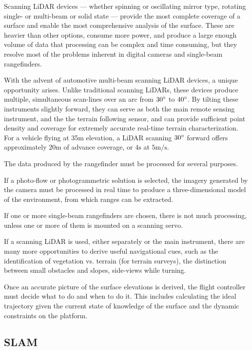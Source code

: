 \documentclass[10pt,a4paper]{report}
\begin{document}
Scanning LiDAR devices --- whether spinning or oscillating mirror type, rotating single- or multi-beam or solid state --- provide the most complete coverage of a surface and enable the most comprehensive analysis of the surface. These are heavier than other options, consume more power, and produce a large enough volume of data that processing can be complex and time consuming, but they resolve most of the problems inherent in digital cameras and single-beam rangefinders.

With the advent of automotive multi-beam scanning LiDAR devices, a unique opportunity arises. Unlike traditional scanning LiDARs, these devices produce multiple, simultaneous scan-lines over an arc from $30\degree$ to $40\degree$. By tilting these instruments slightly forward, they can serve as both the main remote sensing instrument, and the the terrain following sensor, and can provide sufficient point density and coverage for extremely accurate real-time terrain characterization. For a vehicle flying at 35m elevation, a LiDAR scanning $30\degree$ forward offers approximately $20\si{\m}$ of advance coverage, or $4\si{\s}$ at $5\si{\m\per\s}$. 

The data produced by the rangefinder must be processed for several purposes. 

If a photo-flow or photogrammetric solution is selected, the imagery generated by the camera must be processed in real time to produce a three-dimensional model of the environment, from which ranges can be extracted.

If one or more single-beam rangefinders are chosen, there is not much processing, unless one or more of them is mounted on a scanning servo.

If a scanning LiDAR is used, either separately or the main instrument, there are many more opportunities to derive useful navigational cues, such as the identification of vegetation vs. terrain (for terrain surveys), the distinction between small obstacles and slopes, side-views while turning.

Once an accurate picture of the surface elevations is derived, the flight controller must decide what to do and when to do it. This includes calculating the ideal trajectory given the current state of knowledge of the surface and the dynamic constraints on the platform.


\iffalse


\subsection{SLAM}
\end{document}
